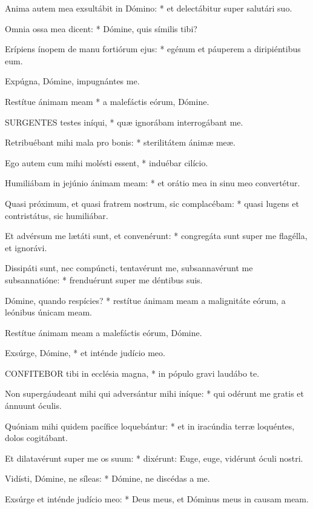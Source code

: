 Anima autem mea exsultábit in Dómino: * et delectábitur super salutári suo.

Omnia ossa mea dicent: * Dómine, quis símilis tibi?

Erípiens ínopem de manu fortiórum ejus: * egénum et páuperem a diripiéntibus eum.

 Expúgna, Dómine, impugnántes me.

 Restítue ánimam meam * a malefáctis eórum, Dómine.


\lettrine[lines=2]{S}{URGENTES} testes iníqui, * quæ ignorábam interrogábant me.

Retribuébant mihi mala pro bonis: * sterilitátem ánimæ meæ.

Ego autem cum mihi molésti essent, * induébar cilício.

Humiliábam in jejúnio ánimam meam: * et orátio mea in sinu meo convertétur.

Quasi próximum, et quasi fratrem nostrum, sic complacébam: * quasi lugens et contristátus, sic humiliábar.

Et advérsum me lætáti sunt, et convenérunt: * congregáta sunt super me flagélla, et ignorávi.

Dissipáti sunt, nec compúncti, tentavérunt me, subsannavérunt me subsannatióne: * frenduérunt super me déntibus suis.

Dómine, quando respícies? * restítue ánimam meam a malignitáte eórum, a leónibus únicam meam.

 Restítue ánimam meam a malefáctis eórum, Dómine.

 Exsúrge, Dómine, * et inténde judício meo.


\lettrine[lines=2]{C}{ONFITEBOR} tibi in ecclésia magna, * in pópulo gravi laudábo te.

Non supergáudeant mihi qui adversántur mihi iníque: * qui odérunt me gratis et ánnuunt óculis.

Quóniam mihi quidem pacífice loquebántur: * et in iracúndia terræ loquéntes, dolos cogitábant.

Et dilatavérunt super me os suum: * dixérunt: Euge, euge, vidérunt óculi nostri.

Vidísti, Dómine, ne síleas: * Dómine, ne discédas a me.

Exsúrge et inténde judício meo: * Deus meus, et Dóminus meus in causam meam.

